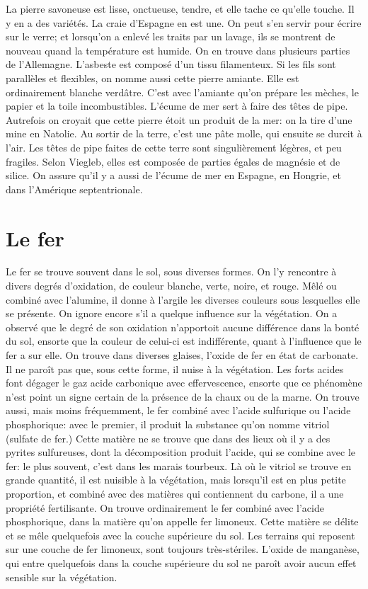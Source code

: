 La pierre savoneuse est lisse, onctueuse, tendre, et elle tache ce qu'elle touche. Il y en a des variétés. La craie d'Espagne en est une. On peut s'en servir pour écrire sur le verre; et lorsqu'on a enlevé les traits par un\setcounter{page}{54} lavage, ils se montrent de nouveau quand la température est humide. On en trouve dans plusieurs parties de l'Allemagne.
L'asbeste est composé d'un tissu filamenteux. Si les fils sont parallèles et flexibles, on nomme aussi cette pierre amiante. Elle est ordinairement blanche verdâtre. C'est avec l'amiante qu'on prépare les mèches, le papier et la toile incombustibles.
L'écume de mer sert à faire des têtes de pipe. Autrefois on croyait que cette pierre étoit un produit de la mer: on la tire d'une mine en Natolie. Au sortir de la terre, c'est une pâte molle, qui ensuite se durcit à l'air. Les têtes de pipe faites de cette terre sont singulièrement légères, et peu fragiles. Selon Viegleb, elles est composée de parties égales de magnésie et de silice. On assure qu'il y a aussi de l'écume de mer en Espagne, en Hongrie, et dans l'Amérique septentrionale.
\section{Le fer}
Le fer se trouve souvent dans le sol, sous diverses formes. On l'y rencontre à divers degrés d'oxidation, de couleur blanche, verte, noire, et rouge. Mêlé ou combiné avec l'alumine, il donne à l'argile les diverses couleurs sous lesquelles elle se présente.\setcounter{page}{55} On ignore encore s'il a quelque influence sur la végétation. On a observé que le degré de son oxidation n'apportoit aucune différence dans la bonté du sol, ensorte que la couleur de celui-ci est indifférente, quant à l'influence que le fer a sur elle.
On trouve dans diverses glaises, l'oxide de fer en état de carbonate. Il ne paroît pas que, sous cette forme, il nuise à la végétation. Les forts acides font dégager le gaz acide carbonique avec effervescence, ensorte que ce phénomène n'est point un signe certain de la présence de la chaux ou de la marne.
On trouve aussi, mais moins fréquemment, le fer combiné avec l'acide sulfurique ou l'acide phosphorique: avec le premier, il produit la substance qu'on nomme vitriol (sulfate de fer.) Cette matière ne se trouve que dans des lieux où il y a des pyrites sulfureuses, dont la décomposition produit l'acide, qui se combine avec le fer: le plus souvent, c'est dans les marais tourbeux. Là où le vitriol se trouve en grande quantité, il est nuisible à la végétation, mais lorsqu'il est en plus petite proportion, et combiné avec des matières qui contiennent du carbone, il a une propriété fertilisante.
On trouve ordinairement le fer combiné\setcounter{page}{56} avec l'acide phosphorique, dans la matière qu'on appelle fer limoneux. Cette matière se délite et se mêle quelquefois avec la couche supérieure du sol. Les terrains qui reposent sur une couche de fer limoneux, sont toujours très-stériles. L'oxide de manganèse, qui entre quelquefois dans la couche supérieure du sol ne paroît avoir aucun effet sensible sur la végétation.
